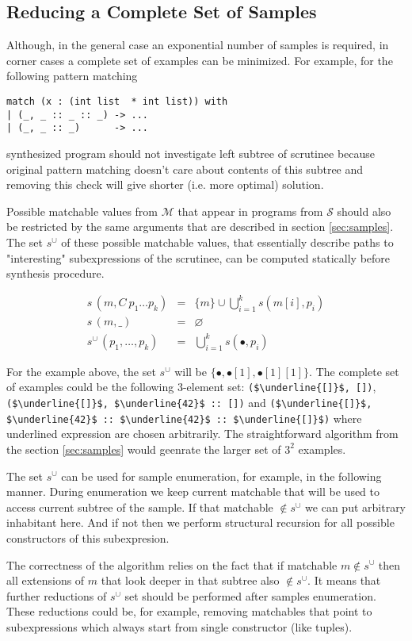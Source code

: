 \subsection{Reducing a Complete Set of Samples}
\label{sec:reduced-samples}

Although, in the general case an exponential number of samples is required, in corner cases a complete set of examples can be minimized. For example, for the following pattern matching 

\begin{lstlisting}
match (x : (int list  * int list)) with 
| (_, _ :: _ :: _) -> ...
| (_, _ :: _)      -> ...
\end{lstlisting}

\noindent synthesized program should not investigate left subtree of scrutinee because original pattern matching doesn't care about contents of this subtree and removing this check will give shorter (i.e. more optimal) solution.

Possible matchable values  from $\mathcal{M}$ that appear in programs from  $\mathcal{S}$  should also be restricted by the same arguments that are described in section \ref{sec:samples}. The set $s^\cup$ of these possible matchable values, that essentially describe paths to "interesting" subexpressions of the scrutinee, can be computed statically before synthesis procedure.

\[
\begin{array}{rcl}
   s\,(m, C\ p_1 \dots p_k)     & = & \{m\}\cup \bigcup\limits_{i=1}^{k} s(m[i], p_i)\\
   s\,(m,\_)                 & = & \varnothing \\
   s^\cup\,(p_1,\dots, p_k) & = & \bigcup\limits_{i=1}^{k} s(\bullet, p_i)
\end{array}
\]

\noindent For the example above, the set  $s^\cup$ will be 
$\{\bullet, \bullet[1], \bullet[1][1]\}$. The complete set of examples could be the following 3-element set:
\lstinline=($\underline{[]}$, [])=, \lstinline=($\underline{[]}$, $\underline{42}$ :: [])= and  \lstinline=($\underline{[]}$, $\underline{42}$ :: $\underline{42}$ :: $\underline{[]}$)= where underlined expression are chosen arbitrarily. The straightforward algorithm from the section \ref{sec:samples} would geenrate the larger set of $3^2$ examples.

The set $s^\cup$ can be used for sample enumeration, for example, in the following manner. During enumeration we keep current matchable that will be used to access current subtree of the sample. If that matchable $\notin s^\cup$ we can put arbitrary inhabitant here. And if not then we perform structural recursion for all possible constructors of this subexpresion.

The correctness of the algorithm relies on the fact that if matchable  $m \notin s^\cup$ then all extensions of $m$ that look deeper in that subtree also $\notin s^\cup$. It means that further reductions of $s^\cup$ set should be performed after samples enumeration. These reductions could be, for example, removing matchables that point to subexpressions which always start from single constructor (like tuples).

